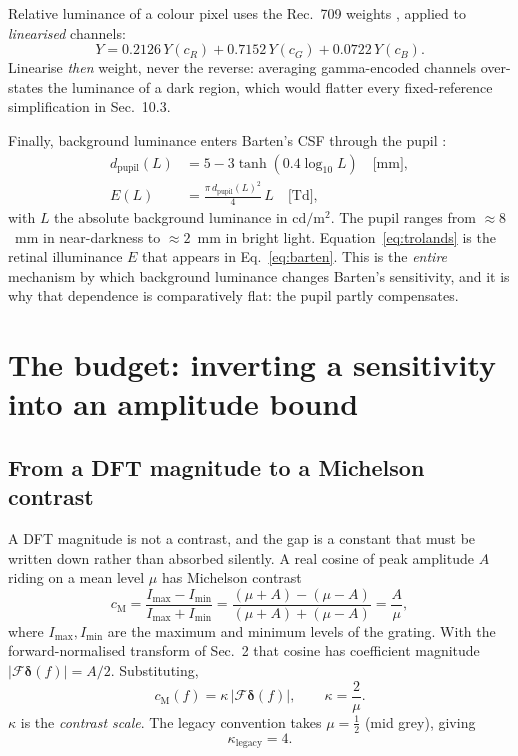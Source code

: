 \documentclass[11pt,a4paper]{article}
\begin{document}
Relative luminance of a colour pixel uses the Rec.~709 weights
\citep{itu709}, applied to \emph{linearised} channels:
\begin{equation}
  Y = 0.2126\,Y(c_R) + 0.7152\,Y(c_G) + 0.0722\,Y(c_B).
  \label{eq:luma}
\end{equation}
Linearise \emph{then} weight, never the reverse: averaging gamma-encoded
channels over-states the luminance of a dark region, which would flatter
every fixed-reference simplification in Sec.~10.3.

Finally, background luminance enters Barten's CSF through the pupil
\citep[Eq.~2.9]{barten1999}:
\begin{align}
  d_{\mathrm{pupil}}(L) &= 5 - 3\tanh\!\left(0.4\log_{10}L\right)
     \quad\text{[mm]}, \label{eq:pupil}\\
  E(L) &= \frac{\pi\, d_{\mathrm{pupil}}(L)^2}{4}\, L \quad\text{[Td]},
     \label{eq:trolands}
\end{align}
with $L$ the absolute background luminance in $\mathrm{cd/m^2}$. The pupil
ranges from $\approx8$~mm in near-darkness to $\approx2$~mm in bright light.
Equation~\eqref{eq:trolands} is the retinal illuminance $E$ that appears in
Eq.~\eqref{eq:barten}. This is the \emph{entire} mechanism by which
background luminance changes Barten's sensitivity, and it is why that
dependence is comparatively flat: the pupil partly compensates.

\section{The budget: inverting a sensitivity into an amplitude bound}

\subsection{From a DFT magnitude to a Michelson contrast}
\label{sec:kappa}

A DFT magnitude is not a contrast, and the gap is a constant that must be
written down rather than absorbed silently. A real cosine of peak amplitude
$A$ riding on a mean level $\mu$ has Michelson contrast \citep{michelson1927}
\begin{equation}
  c_{\mathrm{M}}
  = \frac{I_{\max}-I_{\min}}{I_{\max}+I_{\min}}
  = \frac{(\mu+A)-(\mu-A)}{(\mu+A)+(\mu-A)}
  = \frac{A}{\mu},
  \label{eq:michelson}
\end{equation}
where $I_{\max},I_{\min}$ are the maximum and minimum levels of the grating.
With the forward-normalised transform of Sec.~2 that cosine has coefficient
magnitude $|\mathcal{F}\boldsymbol{\delta}(f)| = A/2$. Substituting,
\begin{equation}
  c_{\mathrm{M}}(f) = \kappa\,\big|\mathcal{F}\boldsymbol{\delta}(f)\big|,
  \qquad
  \kappa = \frac{2}{\mu}.
  \label{eq:kappa}
\end{equation}
$\kappa$ is the \emph{contrast scale}. The legacy convention takes
$\mu=\tfrac12$ (mid grey), giving
\begin{equation}
  \kappa_{\mathrm{legacy}} = 4 .
  \label{eq:kappa4}
\end{equation}
\end{document}
